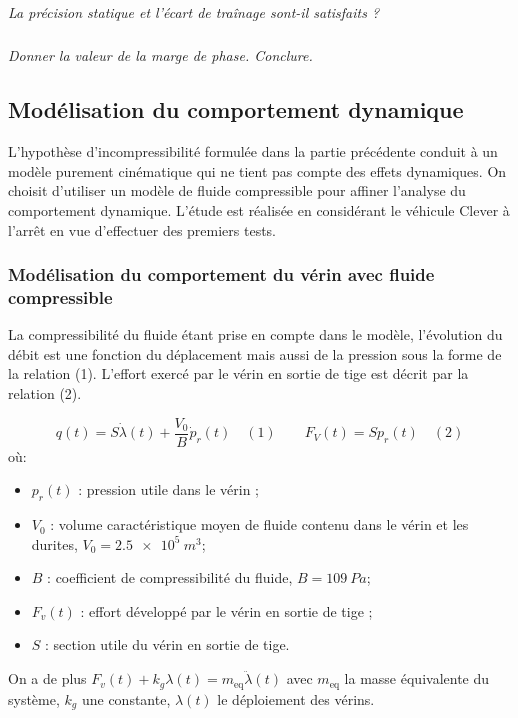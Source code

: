 \documentclass[10pt,fleqn]{article} %
\begin{document}
\begin{multicols}{2}
\subparagraph{}\textit{La précision statique et l'écart de traînage sont-il satisfaits ?} 
\ifprof
\begin{corrige}
\end{corrige}
\else
\fi

\subparagraph{}\textit{ Donner la valeur de la marge de phase. Conclure.} 
\ifprof
\begin{corrige}
\end{corrige}
\else
\fi

\subsection*{Modélisation du comportement dynamique}

L'hypothèse d'incompressibilité formulée dans la partie précédente conduit à un modèle purement cinématique qui ne tient pas compte des effets dynamiques. On choisit d'utiliser un modèle de fluide compressible pour affiner l'analyse du comportement dynamique. L'étude est réalisée en considérant le véhicule Clever à l'arrêt en vue d'effectuer des premiers tests.


\subsubsection*{Modélisation du comportement du vérin avec fluide compressible}

La compressibilité du fluide étant prise en compte dans le modèle, l'évolution du débit est une fonction du déplacement mais aussi de la pression sous la forme de la relation (1). L'effort exercé par le vérin en sortie de tige est décrit par la relation (2).

$$
q(t)=S\dot{\lambda}(t)+\dfrac{V_0}{B}\dot{p}_r(t) \quad (1) \quad\quad
F_V(t)=Sp_r(t) \quad (2)
$$
où:
\begin{itemize}
\item $p_r(t)$ : pression utile dans le vérin ;
\item $V_0$ : volume caractéristique moyen de fluide contenu dans le vérin et les durites, $V_0 = \SI{2,5e5}{m^3}$;
\item $B$ : coefficient de compressibilité du fluide, $B = \SI{109}{Pa}$;
\item $F_v(t)$ : effort développé par le vérin en sortie de tige ;
\item $S$ : section utile du vérin en sortie de tige.
\end{itemize}

On a de plus $F_v(t)+k_g \lambda(t)=m_{\text{eq}}\ddot{\lambda}(t)$ avec $m_{\text{eq}}$ la masse équivalente du système, $k_g$ une constante, $\lambda(t)$ le déploiement des vérins.




\end{multicols}
\end{document}
